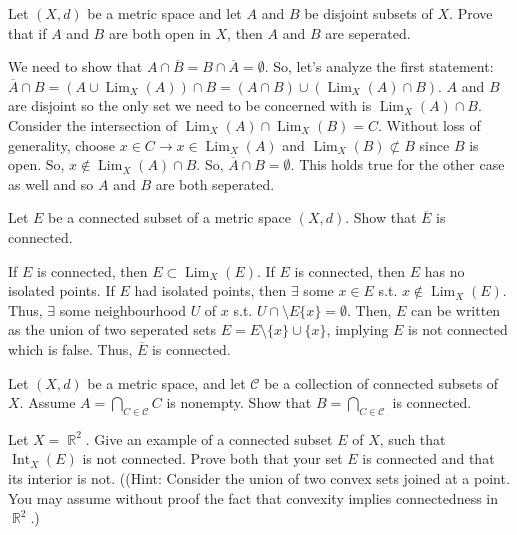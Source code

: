 \documentclass[12pt,letterpaper,boxed]{hmcpset}
\DeclareMathOperator{\Lim}{Lim}
\DeclareMathOperator{\Int}{Int}
\DeclareMathOperator{\R}{\mathbb{R}}
\begin{document}
\begin{problem}[Exercise 5.7]
Let $(X, d)$ be a metric space and let $A$ and $B$ be disjoint subsets of $X$. Prove that if $A$ and $B$ are both open in $X$, then $A$ and $B$ are seperated.
\end{problem}

\begin{solution}
We need to show that $A \cap \overline{B} = B \cap \overline{A} = \emptyset.$ So, let's analyze the first statement: $\overline{A}\cap B = (A \cup \Lim_{X}(A))\cap B = (A \cap B)\cup(\Lim_{X}(A) \cap B).$ $A$ and $B$ are disjoint so the only set we need to be concerned with is $\Lim_{X}(A) \cap B$. Consider the intersection of $\Lim_X(A)\cap \Lim_X(B) = C.$ Without loss of generality, choose $x \in C \rightarrow x \in \Lim_X(A)$ and $\Lim_X(B)\not \subset B$ since $B$ is open. So, $x \notin \Lim_X(A)\cap B.$ So, $\overline{A}\cap B = \emptyset$. This holds true for the other case as well and so $A$ and $B$ are both seperated.  
\end{solution}

\begin{problem}[Exercise 5.8]
Let $E$ be a connected subset of a metric space $(X, d)$. Show that $\overline{E}$ is connected.
\end{problem}

\begin{solution}
If $E$ is connected, then $E \subset \Lim_X (E)$. If $E$ is connected, then $E$ has no isolated points. If $E$ had isolated points, then $\exists$ some $x\in E$ s.t. $x \notin \Lim_X (E)$. Thus, $\exists$ some neighbourhood $U$ of $x$ s.t. $U\cap\setminus E\{x\} = \emptyset.$ Then, $E$ can be written as the union of two seperated sets $E = E\setminus \{x\}\cup \{x\}$, implying $E$ is not connected which is false. Thus, $\overline{E}$ is connected. 
\end{solution}

\begin{problem}[Exercise 5.12]
Let $(X,d)$ be a metric space, and let $\mathcal{C}$ be a collection of connected subsets of $X$. Assume $A = \bigcap_{C \in \mathcal{C}} C$ is nonempty. Show that $B = \bigcap_{C \in \mathcal{C}}$ is connected.
\end{problem}

\begin{solution}
 
\end{solution}

\begin{problem}[Exercise 5.13]
Let $X = \R^{2}$. Give an example of a connected subset $E$ of $X$, such that $\Int_X(E)$ is not connected. Prove both that your set $E$ is connected and that its interior is not. ((Hint: Consider the
union of two convex sets joined at a point. You may assume without proof the fact that convexity implies
connectedness in $\R^{2}$.)
\end{problem}

\begin{solution}
 
\end{solution}
\end{document}
